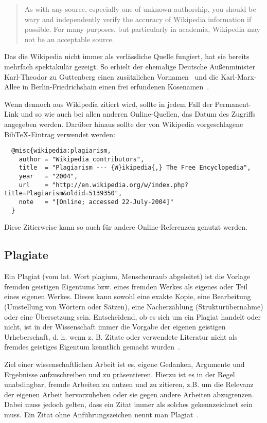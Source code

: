 \begin{quote}
  \glqq As with any source, especially one of unknown authorship, you should be wary and independently verify the accuracy of Wikipedia information if possible. For many purposes, but particularly in academia, Wikipedia may not be an acceptable source.\grqq{}
\end{quote}

Das die Wikipedia nicht immer als verlässliche Quelle fungiert, hat sie bereits mehrfach spektakulär gezeigt. So erhielt der ehemalige Deutsche Außenminister Karl-Theodor zu Guttenberg einen zusätzlichen Vornamen~\cite{bildblog:guttenberg,spiegel:guttenberg} und die Karl-Marx-Allee in Berlin-Friedrichshain einen frei erfundenen Kosenamen~\cite{rundschau:wikipedia}.

Wenn dennoch aus Wikipedia zitiert wird, sollte in jedem Fall der Permanent-Link und so wie auch bei allen anderen Online-Quellen, das Datum des Zugriffs angegeben werden. Darüber hinaus sollte der von Wikipedia vorgeschlagene BibTeX-Eintrag verwendet werden:

\begin{lstlisting}
  @misc{wikipedia:plagiarism,
    author = "Wikipedia contributors",
    title  = "Plagiarism --- {W}ikipedia{,} The Free Encyclopedia",
    year   = "2004",
    url    = "http://en.wikipedia.org/w/index.php?title=Plagiarism&oldid=5139350",
    note   = "[Online; accessed 22-July-2004]"
  }
\end{lstlisting}
\smallskip

Diese Zitierweise kann so auch für andere Online-Referenzen genutzt werden.

\subsection{Plagiate}\label{ssec:plagiate}
%
Ein Plagiat (vom lat. Wort plagium, \glqq Menschenraub\grqq{} abgeleitet) ist die Vorlage fremden geistigen Eigentums bzw. eines fremden Werkes als eigenes oder Teil eines eigenen Werkes. Dieses kann sowohl eine exakte Kopie, eine Bearbeitung (Umstellung von Wörtern oder Sätzen), eine Nacherzählung (Strukturübernahme) oder eine Übersetzung sein. Entscheidend, ob es sich um ein Plagiat handelt oder nicht, ist in der Wissenschaft immer die Vorgabe der eigenen geistigen Urheberschaft, d. h. wenn z. B. Zitate oder verwendete Literatur nicht als fremdes geistiges Eigentum kenntlich gemacht wurden~\cite{wikipedia:plagiarism,wulff:2013:01}.

Ziel einer wissenschaftlichen Arbeit ist es, eigene Gedanken, Argumente und Ergebnisse aufzuschreiben und zu präsentieren. Hierzu ist es in der Regel unabdingbar, fremde Arbeiten zu nutzen und zu zitieren, z.B. um die Relevanz der eigenen Arbeit hervorzuheben oder sie gegen andere Arbeiten abzugrenzen. Dabei muss jedoch gelten, dass ein Zitat immer als solches gekennzeichnet sein muss. Ein \glqq Zitat ohne Anführungszeichen\grqq{} nennt man Plagiat~\cite{eco:2010:01}.

